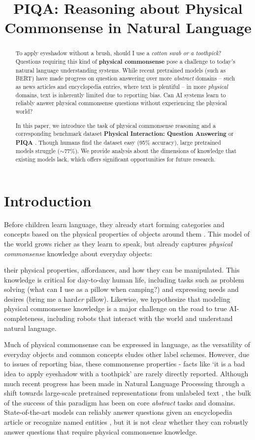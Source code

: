 \title{PIQA: Reasoning about Physical Commonsense in Natural Language}

\begin{abstract}
To apply eyeshadow without a brush, should I use a \textit{cotton swab or a toothpick}? Questions requiring this kind of  \textbf{physical commonsense} pose a challenge to today's natural language understanding systems. While recent pretrained models (such as BERT) have made progress on question answering over more \emph{abstract} domains -- such as news articles and encyclopedia entries, where text is plentiful -- in more \emph{physical} domains, text is inherently limited due to reporting bias. Can AI systems learn to reliably answer physical commonsense questions without experiencing the physical world?

In this paper, we introduce the task of physical commonsense reasoning and a corresponding benchmark dataset \textbf{Physical Interaction: Question Answering} or \textbf{PIQA} \raisebox{-0.3pt}. Though humans find the dataset easy (95\% accuracy), large pretrained models struggle ($\sim$77\%). We provide analysis about the dimensions of knowledge that existing models lack, which offers significant opportunities for future research.
\end{abstract}

\section{Introduction}
Before children learn language, they already start forming categories and concepts based on the physical properties of objects around them \cite{hespos2004}.  This model of the world grows richer as they learn to speak, but already captures \emph{physical commonsense} knowledge about everyday objects:

their physical properties, affordances, and how they can be manipulated. This knowledge is critical for day-to-day human life, including tasks such as problem solving (what can I use as a pillow when camping?) and expressing needs and desires (bring me a hard\textit{er} pillow).  Likewise, we hypothesize that modeling physical commonsense knowledge is a major challenge on the road to true AI-completeness, including robots that interact with the world and understand natural language.

Much of physical commonsense can be expressed in language, as the versatility of everyday objects and common concepts eludes other label schemes. However, due to issues of reporting bias, these commonsense properties - facts like `it is a bad idea to apply eyeshadow with a toothpick' are rarely directly reported. Although much recent progress has been made in Natural Language Processing through a shift towards large-scale pretrained representations from unlabeled text \cite{Radford2018,Devlin2018,Liu2019}, the bulk of the success of this paradigm has been on core \emph{abstract} tasks and domains. State-of-the-art models can reliably answer questions given an encyclopedia article \cite{rajpurkar2016squad} or recognize named entities  \cite{tjong-kim-sang-de-meulder-2003-introduction}, but it is not clear whether they can robustly answer questions that require physical commonsense knowledge.

